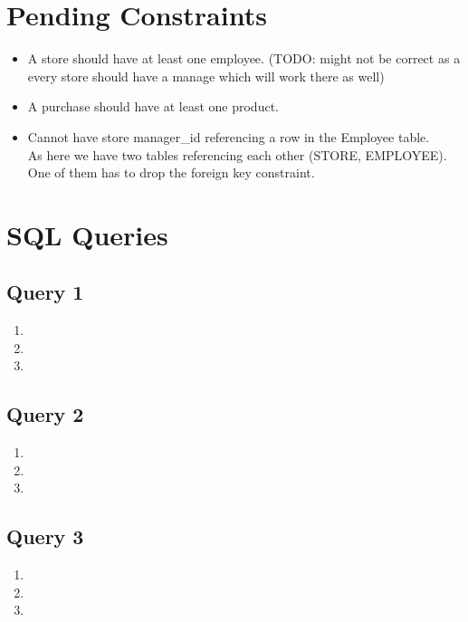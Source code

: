 \documentclass[a4paper,11pt]{article}
\begin{document}
\section{Pending Constraints}
\begin{itemize}
    \item A store should have at least one employee. (TODO: might not be correct as a every store should have a manage which will work there as well)
    \item A purchase should have at least one product.
    \item Cannot have store manager\_id referencing a row in the Employee table.\\
        As here we have two tables referencing each other (STORE, EMPLOYEE).\\
        One of them has to drop the foreign key constraint.

\end{itemize}

\section{SQL Queries}
\subsection*{Query 1}
\begin{enumerate}[label=(\alph*)]
    \item
    \item
    \item
\end{enumerate}

\subsection*{Query 2}
\begin{enumerate}[label=(\alph*)]
    \item
    \item
    \item
\end{enumerate}

\subsection*{Query 3}
\begin{enumerate}[label=(\alph*)]
    \item
    \item
    \item
\end{enumerate}
\end{document}

